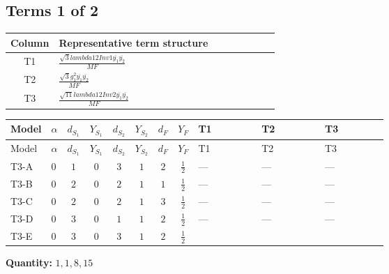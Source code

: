 \documentclass[8pt]{article}
\begin{document}
\begin{landscape}
\subsection*{Terms 1 of 2}
\begin{center}
\begin{tabular}{@{}c >{\raggedright\arraybackslash}p{0.82\linewidth}@{}}
\toprule
Column & Representative term structure \\
\midrule
T1 & \(\displaystyle \frac{\sqrt{3} lambda12Inv1 \overline{y_{1}} \overline{y_{2}}}{MF}\) \\
\midrule
T2 & \(\displaystyle \frac{\sqrt{3} g_{1}^{2} \overline{y_{1}} \overline{y_{2}}}{MF}\) \\
\midrule
T3 & \(\displaystyle \frac{\sqrt{11} lambda12Inv2 \overline{y_{1}} \overline{y_{2}}}{MF}\) \\
\midrule
\bottomrule
\end{tabular}
\end{center}
\smallskip
\tiny
\begin{longtable}{@{}llcccccc >{\raggedright\arraybackslash}p{0.21\linewidth} >{\raggedright\arraybackslash}p{0.21\linewidth} >{\raggedright\arraybackslash}p{0.21\linewidth}@{}}
\toprule
Model & $\alpha$ & $d_{S_1}$ & $Y_{S_1}$ & $d_{S_2}$ & $Y_{S_2}$ & $d_F$ & $Y_F$ & T1 & T2 & T3 \\
\midrule
\endfirsthead
\toprule
Model & $\alpha$ & $d_{S_1}$ & $Y_{S_1}$ & $d_{S_2}$ & $Y_{S_2}$ & $d_F$ & $Y_F$ & T1 & T2 & T3 \\
\midrule
\endhead
T3-A & $0$ & $1$ & $0$ & $3$ & $1$ & $2$ & $\frac{1}{2}$ & --- & --- & --- \\
\midrule
T3-B & $0$ & $2$ & $0$ & $2$ & $1$ & $1$ & $\frac{1}{2}$ & --- & --- & --- \\
\midrule
T3-C & $0$ & $2$ & $0$ & $2$ & $1$ & $3$ & $\frac{1}{2}$ & --- & --- & --- \\
\midrule
T3-D & $0$ & $3$ & $0$ & $1$ & $1$ & $2$ & $\frac{1}{2}$ & --- & --- & --- \\
\midrule
T3-E & $0$ & $3$ & $0$ & $3$ & $1$ & $2$ & $\frac{1}{2}$ & \scriptsize\adjustbox{max width=\linewidth}{$\begin{gathered} - \frac{\sqrt{3} lambda12Inv1 \overline{y_{1}} \overline{y_{2}}}{6 MF}\end{gathered}$} & \scriptsize\adjustbox{max width=\linewidth}{$\begin{gathered} \frac{\sqrt{3} g_{1}^{2} \overline{y_{1}} \overline{y_{2}}}{8 MF}\end{gathered}$} & \scriptsize\adjustbox{max width=\linewidth}{$\begin{gathered} \frac{3 \sqrt{11} lambda12Inv2 \overline{y_{1}} \overline{y_{2}}}{22 MF}\end{gathered}$} \\
\midrule
\bottomrule
\end{longtable}
\clearpage
\noindent\textbf{Quantity: }$\mathrm{1,1,8,15}$\par\smallskip

\end{landscape}
\end{document}
